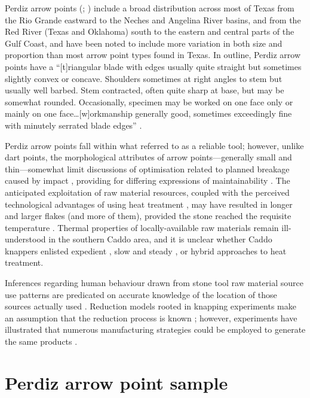 \documentclass[review]{elsarticle}
\begin{document}
Perdiz arrow points (\citealp[283 and Plate 142]{RN7795}; \citealp[504 and Plate 131]{RN5769}) include a broad distribution across most of Texas from the Rio Grande eastward to the Neches and Angelina River basins, and from the Red River (Texas and Oklahoma) south to the eastern and central parts of the Gulf Coast, and have been noted to include more variation in both size and proportion than most arrow point types found in Texas. In outline, Perdiz arrow points have a “[t]riangular blade with edges usually quite straight but sometimes slightly convex or concave. Shoulders sometimes at right angles to stem but usually well barbed. Stem contracted, often quite sharp at base, but may be somewhat rounded. Occasionally, specimen may be worked on one face only or mainly on one face…[w]orkmanship generally good, sometimes exceedingly fine with minutely serrated blade edges” \cite[504]{RN5769}. 

Perdiz arrow points fall within what \citet[738-741]{RN5873} referred to as a reliable tool; however, unlike dart points, the morphological attributes of arrow points---generally small and thin---somewhat limit discussions of optimisation related to planned breakage caused by impact \citep{RN6170,RN7045}, providing for differing expressions of maintainability \citep{RN5789}. The anticipated exploitation of raw material resources, coupled with the perceived technological advantages of using heat treatment \citep{RN6171}, may have resulted in longer and larger flakes (and more of them), provided the stone reached the requisite temperature \citep{RN5900}. Thermal properties of locally-available raw materials remain ill-understood in the southern Caddo area, and it is unclear whether Caddo knappers enlisted expedient \citep{RN8970,RN6201}, slow and steady \citep{RN8971}, or hybrid approaches to heat treatment.

Inferences regarding human behaviour drawn from stone tool raw material source use patterns are predicated on accurate knowledge of the location of those sources actually used \citep[365]{RN5787}. Reduction models rooted in knapping experiments make an assumption that the reduction process is known \citep{RN6855}; however, experiments have illustrated that numerous manufacturing strategies could be employed to generate the same products \citep{RN8968,RN8969}. 

\section*{Perdiz arrow point sample}
\end{document}
